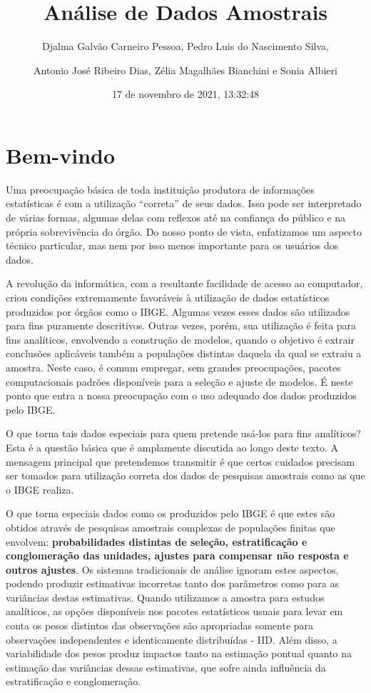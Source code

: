 \documentclass[
  12pt,
  brazilian,
]{book}
\title{Análise de Dados Amostrais}
\author{Djalma Galvão Carneiro Pessoa, Pedro Luis do Nascimento Silva, \and Antonio José Ribeiro Dias, Zélia Magalhães Bianchini e Sonia Albieri}
\date{17 de novembro de 2021, 13:32:48}
\theoremstyle{definition}
\theoremstyle{definition}
\theoremstyle{definition}
\theoremstyle{definition}
\theoremstyle{remark}
\begin{document}
\maketitle

{
\setcounter{tocdepth}{1}
\tableofcontents
}
\hypertarget{bem-vindo}{%
\chapter*{Bem-vindo}\label{bem-vindo}}

Uma preocupação básica de toda instituição produtora de informações estatísticas é com a utilização ``correta'' de seus dados. Isso pode ser interpretado de várias formas, algumas delas com reflexos até na confiança do público e na
própria sobrevivência do órgão. Do nosso ponto de vista, enfatizamos um aspecto
técnico particular, mas nem por isso menos importante para os usuários dos dados.

A revolução da informática, com a resultante facilidade de acesso ao computador, criou condições extremamente favoráveis à utilização de dados estatísticos produzidos por órgãos como o IBGE. Algumas vezes esses dados são utilizados para fins puramente descritivos. Outras vezes, porém, sua utilização é feita para fins analíticos, envolvendo a construção de modelos, quando o objetivo é extrair conclusões aplicáveis também a populações distintas daquela da qual se extraiu a amostra. Neste caso, é comum empregar, sem grandes preocupações, pacotes
computacionais padrões disponíveis para a seleção e ajuste de modelos. É neste ponto que entra a nossa preocupação com o uso adequado dos dados produzidos pelo IBGE.

O que torna tais dados especiais para quem pretende usá-los para fins
analíticos? Esta é a questão básica que é amplamente discutida ao longo deste texto. A mensagem principal que pretendemos transmitir é que certos cuidados precisam ser tomados para utilização correta dos dados de pesquisas amostrais como as que o IBGE realiza.

O que torna especiais dados como os produzidos pelo IBGE é que estes são obtidos através de pesquisas amostrais complexas de populações finitas que envolvem: \textbf{probabilidades distintas de seleção, estratificação e conglomeração das unidades, ajustes para compensar não resposta e outros ajustes}. Os sistemas
tradicionais de análise ignoram estes aspectos, podendo produzir estimativas incorretas tanto dos parâmetros como para as variâncias destas estimativas. Quando utilizamos a amostra para estudos analíticos, as opções disponíveis nos pacotes estatísticos usuais para levar em conta os pesos distintos das observações são apropriadas somente para observações independentes e identicamente distribuídas - IID. Além disso, a variabilidade dos pesos produz
impactos tanto na estimação pontual quanto na estimação das variâncias dessas estimativas, que sofre ainda influência da estratificação e conglomeração.
\end{document}
